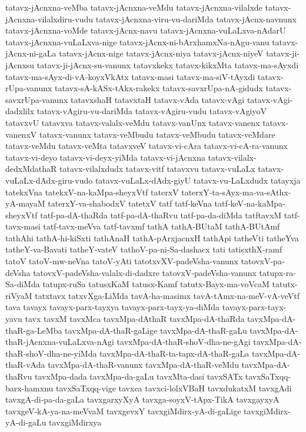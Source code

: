 {tatavx-jAcnxna-veMba
tatavx-jAcnxna-veMdu
tatavx-jAcnxna-vilalxde
tatavx-jAcnxna-vilalxdiru-vudu
tatavx-jAcnxna-viru-vu-dariMda
tatavx-jAcnx-navnunx
tatavx-jAcnxna-voMde
tatavx-jAcnx-navu
tatavx-jAcnxna-vuLaLxva-nAdarU
tatavx-jAcnxna-vuLaLxva-nige
tatavx-jAcnx-ni-bArxhamxNa-nAgu-vanu
tatavx-jAcnx-ni-gaLa
tatavx-jAcnx-nige
tatavx-jAcnx-niya
tatavx-jAcnx-niyeV
tatavx-ji-jAcnxsu
tatavx-ji-jAcnx-su-vanunx
tatavxkekx
tatavx-kikxMta
tatavx-ma-sAyxdi
tatavx-ma-sAyx-di-vA-koyxVkAtx
tatavx-masi
tatavx-ma-siV-tAyxdi
tatavx-rUpa-vanunx
tatavx-sA-kASx-tAkx-rakekx
tatavx-savxrUpa-nA-gidudx
tatavx-savxrUpa-vanunx
tatavxshaH
tatavxtaH
tatavx-vAda
tatavx-vAgi
tatavx-vAgi-dadxlilx
tatavx-vAgiru-vu-dariMda
tatavx-vAgiru-vudu
tatavx-vAgiyoV
tatavxvU
tatavxva
tatavx-valalx-veMdu
tatavx-vanUnx
tatavx-vanenx
tatavx-vanenxV
tatavx-vanunx
tatavx-veMbudu
tatavx-veMbudu
tatavx-veMdare
tatavx-veMdu
tatavx-veMta
tatavxveV
tatavx-vi-cAra
tatavx-vi-cA-ra-vanunx
tatavx-vi-deyo
tatavx-vi-deyx-yiMda
tatavx-vi-jAcnxna
tatavx-vilalx-dedxMdathaR
tatavx-vilalxdudx
tatavx-vitf
tatavxvu
tatavx-vuLaLx
tatavx-vuLaLx-dAdx-giru-vudo
tatavx-vuLaLx-dAdx-giyU
tatavx-vu-LaLxdudx
tatayxja
tatekxVna
tatekxV-na-kaMpa-sheyxVtf
taterxV
taterxY-ta-sAyx-ma-va-sAthx-yA-mayaM
taterxY-va-shabodxV
tatetxV
tatf
tatf-keVna
tatf-keV-na-kaMpa-sheyxVtf
tatf-pa-dA-thaRda
tatf-pa-dA-thaRvu
tatf-pa-da-diMda
tatftavxM
tatf-tavx-masi
tatf-tavx-meVva
tatf-tavxmf
tathA
tathA-BUtaM
tathA-BUtAmf
tathAhi
tathA-hi-kiSxti
tathAnaH
tathA-pArxjacnxH
tathApi
tatheVti
tatheYva
tatheY-va-Bavati
tatheY-vateV
tathoV-pa-ni-Sa-dashacx
tati
tatisxthX-ramf
tatoV
tatoV-mw-neVna
tatoV-yAti
tatotxvXV-padeVsha-vanunx
tatovxV-pa-deVsha
tatovxV-padeVsha-valalx-di-dadxre
tatovxV-padeVsha-vanunx
tatupx-ra-Sa-diMda
tatupx-ruSa
tatusxKaM
tatusx-Kamf
tatutx-Bayx-ma-voVcaM
tatutx-riVyaM
tatxtavx
tatxvXga-LiMda
tavA-ha-masimx
tavA-tAmx-na-meV-vA-veVtf
tava
tavayx
tavayx-parx-tayxya
tavayx-parx-tayx-ya-diMda
tavayx-parx-tayx-yavu
tavx
tavxM
tavxMca
tavxMpa-dAthaR
tavxMpa-dA-thaRda
tavxMpa-dA-thaR-ga-LeMba
tavxMpa-dA-thaR-gaLige
tavxMpa-dA-thaR-gaLu
tavxMpa-dA-thaR-jAcnxna-vuLaLxva-nAgi
tavxMpa-dA-thaR-shoV-dha-ne-gAgi
tavxMpa-dA-thaR-shoV-dha-ne-yiMda
tavxMpa-dA-thaR-ta-tapx-dA-thaR-gaLa
tavxMpa-dA-thaR-vAda
tavxMpa-dA-thaR-vanunx
tavxMpa-dA-thaR-veMdu
tavxMpa-dA-thaRvu
tavxMpa-dada
tavxMpa-da-gaLu
tavxMta-dasi
tavxSATx
tavxSaTxqq-barx-hamxnu
tavxSaTxqq-vige
tavxca
tavxci-lolxVBaH
tavxdukatxM
tavxgAdi
tavxgA-di-pa-da-gaLa
tavxgarxyXyA
tavxga-soyxV-tApx-TikA
tavxgayxyA
tavxgeV-kA-ya-na-meVvaM
tavxgevxY
tavxgiMdirx-yA-di-gaLige
tavxgiMdirx-yA-di-gaLu
tavxgiMdirxya
}
